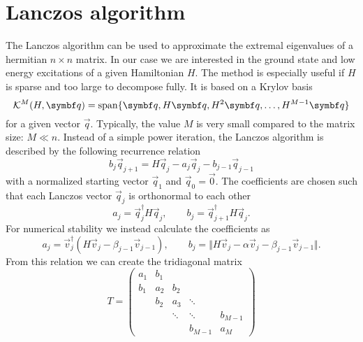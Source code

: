 \section{Lanczos algorithm}
\label{sec:lanczos-algorithm}

The Lanczos algorithm \cite{Lanczos1950} can be used to approximate the extremal eigenvalues
of a hermitian $n\times n$ matrix.
In our case we are interested in the ground state and low energy excitations of a
given Hamiltonian $H$.
The method is especially useful if $H$ is sparse and too large to decompose fully.
It is based on a Krylov basis
\begin{equation}
    \mathcal{K}^M(H, \vec{q}) = \spn\{\vec{q}, H\vec{q}, H^2\vec{q}, \ldots, H^{M-1}\vec{q}\}
\end{equation}
for a given vector $\vec{q}$.
Typically, the value $M$ is very small compared to the matrix size: $M \ll n$.
Instead of a simple power iteration, the Lanczos algorithm is described by the
following recurrence relation
\begin{equation}
    b_j\vec{q}_{j+1} = H\vec{q}_j - a_j\vec{q}_j - b_{j-1}\vec{q}_{j-1}
    \label{eq:Lanczos-recurrence}
\end{equation}
with a normalized starting vector $\vec{q}_1$ and $\vec{q}_0 = \vec{0}$.
The coefficients are chosen such that each Lanczos vector $\vec{q}_j$ is orthonormal to each other
\begin{equation}
    a_j = \vec{q}_j^\dag H \vec{q}_j,
    \qquad
    b_j = \vec{q}_{j+1}^\dag H \vec{q}_j.
\end{equation}
For numerical stability \cite{Paige1972, Paige1976}
we instead calculate the coefficients as
\begin{equation}
    a_j = \vec{v}_j^\dag(H \vec{v}_j - \beta_{j-1}\vec{v}_{j-1}),
    \qquad
    b_j = \Vert H\vec{v}_j - \alpha\vec{v}_j -  \beta_{j-1}\vec{v}_{j-1} \Vert.
\end{equation}
From this relation we can create the tridiagonal matrix
\begin{equation}
    T
    =
    \begin{pmatrix}
        a_1 & b_1 &        &         &         \\
        b_1 & a_2 & b_2    &         &         \\
            & b_2 & a_3    & \ddots  &         \\
            &     & \ddots & \ddots  & b_{M-1} \\
            &     &        & b_{M-1} & a_M
    \end{pmatrix}
    \label{eq:tridiagonal-scalar}
\end{equation}
